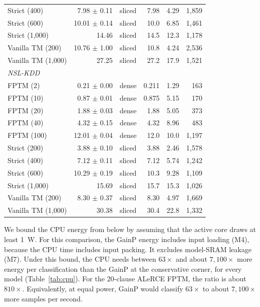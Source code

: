 \documentclass[preprint,12pt]{elsarticle}
\newcommand{\gainp}{GainP}
\newcommand{\hyp}[1]{#1}
\begin{document}
\begin{table}[H]
\begin{tabular}{lrlrrr}
Strict (400) & 7.98 $\pm$ 0.11 & sliced & \hyp{7.98} & \hyp{4.29} & \hyp{1,859} \\
Strict (600) & 10.01 $\pm$ 0.14 & sliced & \hyp{10.0} & \hyp{6.85} & \hyp{1,461} \\
Strict (1,000) & 14.46 & sliced & \hyp{14.5} & \hyp{12.3} & \hyp{1,178} \\
Vanilla TM (200) & 10.76 $\pm$ 1.00 & sliced & \hyp{10.8} & \hyp{4.24} & \hyp{2,536} \\
Vanilla TM (1,000) & 27.25 & sliced & \hyp{27.2} & \hyp{17.9} & \hyp{1,521} \\
\midrule
\multicolumn{6}{l}{\textit{NSL-KDD}} \\
FPTM (2) & 0.21 $\pm$ 0.00 & dense & \hyp{0.211} & \hyp{1.29} & \hyp{163} \\
FPTM (10) & 0.87 $\pm$ 0.01 & dense & \hyp{0.875} & \hyp{5.15} & \hyp{170} \\
FPTM (20) & 1.88 $\pm$ 0.03 & dense & \hyp{1.88} & \hyp{5.05} & \hyp{373} \\
FPTM (40) & 4.32 $\pm$ 0.15 & dense & \hyp{4.32} & \hyp{8.96} & \hyp{483} \\
FPTM (100) & 12.01 $\pm$ 0.04 & dense & \hyp{12.0} & \hyp{10.0} & \hyp{1,197} \\
Strict (200) & 3.88 $\pm$ 0.10 & sliced & \hyp{3.88} & \hyp{2.46} & \hyp{1,578} \\
Strict (400) & 7.12 $\pm$ 0.11 & sliced & \hyp{7.12} & \hyp{5.74} & \hyp{1,242} \\
Strict (600) & 10.29 $\pm$ 0.19 & sliced & \hyp{10.3} & \hyp{9.28} & \hyp{1,109} \\
Strict (1,000) & 15.69 & sliced & \hyp{15.7} & \hyp{15.3} & \hyp{1,026} \\
Vanilla TM (200) & 8.30 $\pm$ 0.37 & sliced & \hyp{8.30} & \hyp{4.97} & \hyp{1,669} \\
Vanilla TM (1,000) & 30.38 & sliced & \hyp{30.4} & \hyp{22.8} & \hyp{1,332} \\
\bottomrule
\end{tabular}

\end{table}

\hyp{We bound the CPU energy from below by assuming that the active core draws at least 1~W. For this comparison, the \gainp{} energy includes input loading (M4), because the CPU time includes input packing. It excludes model-SRAM leakage (M7). Under this bound, the CPU needs between $63\times$ and about $7{,}100\times$ more energy per classification than the \gainp{} at the conservative corner, for every model (Table~\ref{tab:cpu}). For the 20-clause ALeRCE FPTM, the ratio is about $810\times$. Equivalently, at equal power, \gainp{} would classify $63\times$ to about $7{,}100\times$ more samples per second.}
\end{document}
